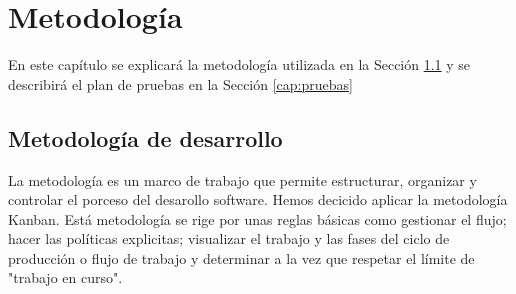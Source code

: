 \chapter{Metodología}
\label{cap:metodologia}
En este capítulo se explicará la metodología utilizada en la Sección \ref{cap:Kanban} y se describirá el plan de pruebas en la Sección \ref{cap:pruebas}
\section{Metodología de desarrollo}
\label{cap:Kanban}
La metodología es un marco de trabajo que permite estructurar, organizar y controlar el porceso del desarollo software. Hemos decicido aplicar la metodología Kanban. Está metodología se rige por unas reglas básicas como gestionar el flujo; hacer las políticas explicitas; visualizar el trabajo y las fases del ciclo de producción o flujo de trabajo y determinar a la vez que respetar el límite de "trabajo en curso".

